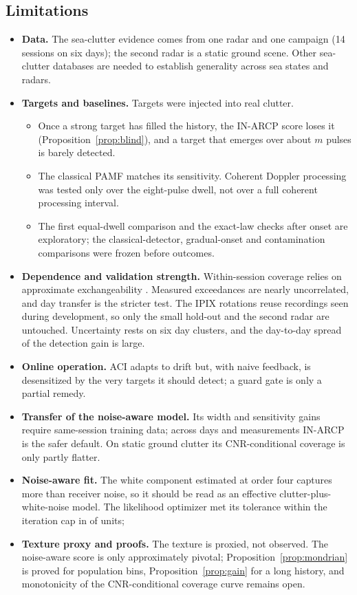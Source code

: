 \documentclass[journal]{IEEEtran}
\begin{document}
\subsection{Limitations}
\begin{itemize}[leftmargin=*,itemsep=1pt]
\item \textbf{Data.} The sea-clutter evidence comes from one radar and one campaign (14 sessions on six days); the second radar is a static ground scene. Other sea-clutter databases \cite{dewind2010csir} are needed to establish generality across sea states and radars.
\item \textbf{Targets and baselines.} Targets were injected into real clutter.
\begin{itemize}[leftmargin=*,itemsep=0pt]
\item Once a strong target has filled the history, the IN-ARCP score loses it (Proposition~\ref{prop:blind}), and a target that emerges over about $m$ pulses is barely detected.
\item The classical PAMF matches its sensitivity. Coherent Doppler processing was tested only over the eight-pulse dwell, not over a full coherent processing interval.
\item The first equal-dwell comparison and the exact-law checks after onset are exploratory; the classical-detector, gradual-onset and contamination comparisons were frozen before outcomes.
\end{itemize}
\item \textbf{Dependence and validation strength.} Within-session coverage relies on approximate exchangeability \cite{barber2023}. Measured exceedances are nearly uncorrelated, and day transfer is the stricter test. The IPIX rotations reuse recordings seen during development, so only the small hold-out and the second radar are untouched. Uncertainty rests on six day clusters, and the day-to-day spread of the detection gain is large.
\item \textbf{Online operation.} ACI adapts to drift but, with naive feedback, is desensitized by the very targets it should detect; a guard gate is only a partial remedy.
\item \textbf{Transfer of the noise-aware model.} Its width and sensitivity gains require same-session training data; across days and measurements IN-ARCP is the safer default. On static ground clutter its CNR-conditional coverage is only partly flatter.
\item \textbf{Noise-aware fit.} The white component estimated at order four captures more than receiver noise, so it should be read as an effective clutter-plus-white-noise model. The likelihood optimizer met its tolerance within the iteration cap in \FitNAFourConv{} of \NUnitsConf{} units; \FitNAFourSentence
\item \textbf{Texture proxy and proofs.} The texture is proxied, not observed. The noise-aware score is only approximately pivotal; Proposition~\ref{prop:mondrian} is proved for population bins, Proposition~\ref{prop:gain} for a long history, and monotonicity of the CNR-conditional coverage curve remains open.
\end{itemize}
\end{document}
